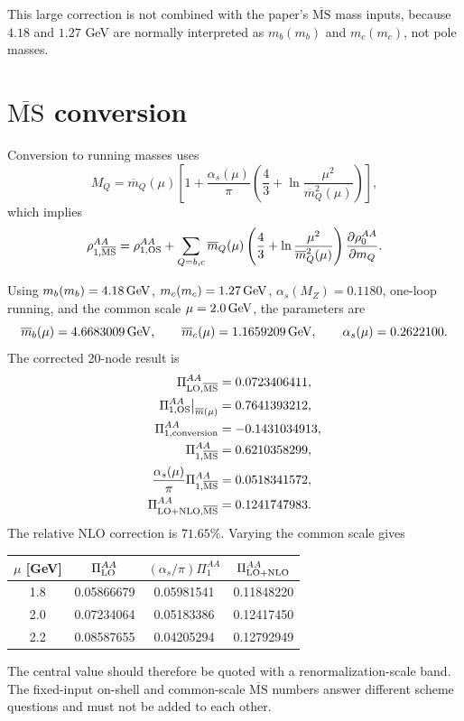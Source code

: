 \documentclass[11pt]{article}
\newcommand{\as}{\alpha_s}
\newcommand{\MSbar}{\overline{\mathrm{MS}}}
\begin{document}
This large correction is not combined with the paper's
\(\MSbar\) mass inputs, because \(4.18\) and \(1.27\) GeV are normally
interpreted as \(m_b(m_b)\) and \(m_c(m_c)\), not pole masses.

\section{\(\MSbar\) conversion}

Conversion to running masses uses
\begin{equation}
 M_Q=\overline m_Q(\mu)\left[
 1+\frac{\as(\mu)}{\pi}
 \left(\frac43+\ln\frac{\mu^2}{\overline m_Q^2(\mu)}\right)
 \right],
\end{equation}
which implies
\begin{equation}
 \rho_{1,\MSbar}^{AA}
 =\rho_{1,\rm OS}^{AA}
 +\sum_{Q=b,c}\overline m_Q(\mu)
 \left(\frac43+\ln\frac{\mu^2}{\overline m_Q^2(\mu)}\right)
 \frac{\partial\rho_0^{AA}}{\partial m_Q}.
\end{equation}

Using \(m_b(m_b)=4.18\,{\rm GeV}\), \(m_c(m_c)=1.27\,{\rm GeV}\),
\(\as(M_Z)=0.1180\), one-loop running, and the common scale
\(\mu=2.0\,{\rm GeV}\), the parameters are
\begin{equation}
 \overline m_b(\mu)=4.6683009\,{\rm GeV},\qquad
 \overline m_c(\mu)=1.1659209\,{\rm GeV},\qquad
 \as(\mu)=0.2622100.
\end{equation}
The corrected 20-node result is
\begin{align}
 \Pi_{\rm LO,\MSbar}^{AA}&=0.0723406411,\\
 \Pi_{1,\rm OS}^{AA}\big|_{\overline m(\mu)}&=0.7641393212,\\
 \Pi_{1,\rm conversion}^{AA}&=-0.1431034913,\\
 \Pi_{1,\MSbar}^{AA}&=0.6210358299,\\
 \frac{\as(\mu)}{\pi}\Pi_{1,\MSbar}^{AA}&=0.0518341572,\\
 \Pi_{\rm LO+NLO,\MSbar}^{AA}&=0.1241747983.
\end{align}
The relative NLO correction is \(71.65\%\).  Varying the common scale gives
\begin{center}
\begin{tabular}{cccc}
\toprule
\(\mu\) [GeV] & \(\Pi_{\rm LO}^{AA}\) &
\((\as/\pi)\Pi_1^{AA}\) & \(\Pi_{\rm LO+NLO}^{AA}\)\\
\midrule
1.8 & 0.05866679 & 0.05981541 & 0.11848220\\
2.0 & 0.07234064 & 0.05183386 & 0.12417450\\
2.2 & 0.08587655 & 0.04205294 & 0.12792949\\
\bottomrule
\end{tabular}
\end{center}
The central value should therefore be quoted with a renormalization-scale
band.  The fixed-input on-shell and common-scale \(\MSbar\) numbers answer
different scheme questions and must not be added to each other.
\end{document}
